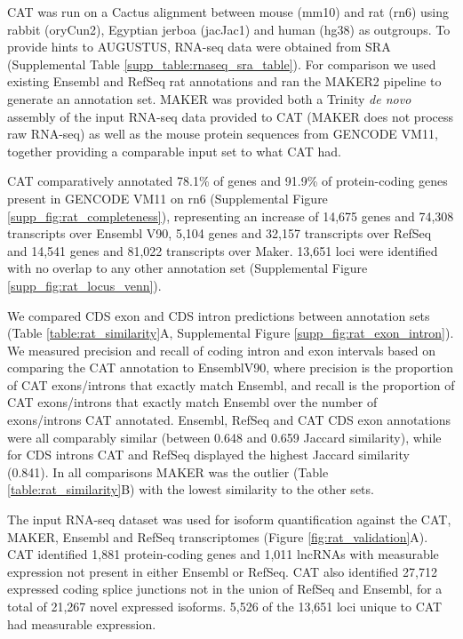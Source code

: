 \documentclass[fleqn,10pt]{wlscirep}
\begin{document}
CAT was run on a Cactus alignment between mouse (mm10) and rat (rn6) using rabbit (oryCun2), Egyptian jerboa (jacJac1) and human (hg38) as outgroups. To provide hints to AUGUSTUS, RNA-seq data were obtained from SRA  \citep{fushan2015gene,cortez2014origins,liu2016identification} (Supplemental Table \ref{supp_table:rnaseq_sra_table}). For comparison we used existing Ensembl and RefSeq rat annotations and ran the MAKER2 pipeline  \citep{cantarel2008maker} to generate an annotation set. MAKER was provided both a Trinity  \citep{haas2013novo} \textit{de novo} assembly of the input RNA-seq data provided to CAT (MAKER does not process raw RNA-seq) as well as the mouse protein sequences from GENCODE VM11, together providing a comparable input set to what CAT had. 
  
CAT comparatively annotated 78.1\% of genes and 91.9\% of protein-coding genes present in GENCODE VM11 on rn6 (Supplemental Figure \ref{supp_fig:rat_completeness}), representing an increase of 14,675 genes and 74,308 transcripts over Ensembl V90, 5,104 genes and 32,157 transcripts over RefSeq and 14,541 genes and 81,022 transcripts over Maker. 13,651 loci were identified with no overlap to any other annotation set (Supplemental Figure \ref{supp_fig:rat_locus_venn}).

We compared CDS exon and CDS intron predictions between annotation sets (Table \ref{table:rat_similarity}A, Supplemental Figure \ref{supp_fig:rat_exon_intron}). We measured precision and recall of coding intron and exon intervals based on comparing the CAT annotation to EnsemblV90, where precision is the proportion of CAT exons/introns that exactly match Ensembl, and recall is the proportion of CAT exons/introns that exactly match Ensembl over the number of exons/introns CAT annotated. Ensembl, RefSeq and CAT CDS exon annotations were all comparably similar (between 0.648 and 0.659 Jaccard similarity), while for CDS introns CAT and RefSeq displayed the highest Jaccard similarity (0.841). In all comparisons MAKER was the outlier (Table \ref{table:rat_similarity}B) with the lowest similarity to the other sets.
  
The input RNA-seq dataset was used for isoform quantification against the CAT, MAKER, Ensembl and RefSeq transcriptomes (Figure \ref{fig:rat_validation}A). CAT identified 1,881 protein-coding genes and 1,011 lncRNAs with measurable expression not present in either Ensembl or RefSeq. CAT also identified 27,712 expressed coding splice junctions not in the union of RefSeq and Ensembl, for a total of 21,267 novel expressed isoforms. 5,526 of the 13,651 loci unique to CAT had measurable expression. 
\end{document}
